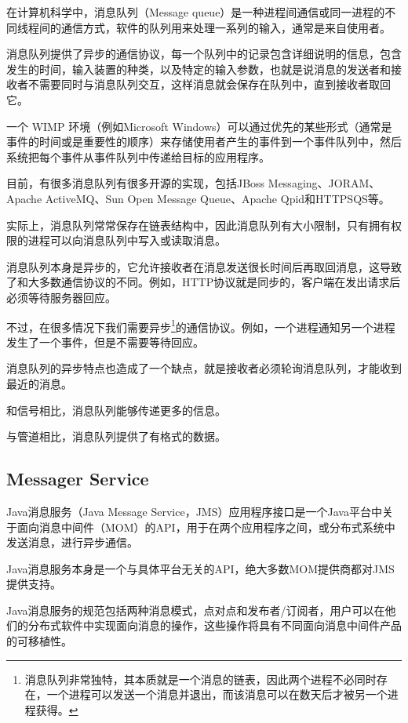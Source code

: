 在计算机科学中，消息队列（Message queue）是一种进程间通信或同一进程的不同线程间的通信方式，软件的队列用来处理一系列的输入，通常是来自使用者。

消息队列提供了异步的通信协议，每一个队列中的记录包含详细说明的信息，包含发生的时间，输入装置的种类，以及特定的输入参数，也就是说消息的发送者和接收者不需要同时与消息队列交互，这样消息就会保存在队列中，直到接收者取回它。

一个 WIMP 环境（例如Microsoft Windows）可以通过优先的某些形式（通常是事件的时间或是重要性的顺序）来存储使用者产生的事件到一个事件队列中，然后系统把每个事件从事件队列中传递给目标的应用程序。


目前，有很多消息队列有很多开源的实现，包括JBoss Messaging、JORAM、Apache ActiveMQ、Sun Open Message Queue、Apache Qpid和HTTPSQS等。

实际上，消息队列常常保存在链表结构中，因此消息队列有大小限制，只有拥有权限的进程可以向消息队列中写入或读取消息。

消息队列本身是异步的，它允许接收者在消息发送很长时间后再取回消息，这导致了和大多数通信协议的不同。例如，HTTP协议就是同步的，客户端在发出请求后必须等待服务器回应。

不过，在很多情况下我们需要异步\footnote{消息队列非常独特，其本质就是一个消息的链表，因此两个进程不必同时存在，一个进程可以发送一个消息并退出，而该消息可以在数天后才被另一个进程获得。}的通信协议。例如，一个进程通知另一个进程发生了一个事件，但是不需要等待回应。

消息队列的异步特点也造成了一个缺点，就是接收者必须轮询消息队列，才能收到最近的消息。

\begin{compactitem}
\item 和信号相比，消息队列能够传递更多的信息。
\item 与管道相比，消息队列提供了有格式的数据。
\end{compactitem}


\subsection{Messager Service}

Java消息服务（Java Message Service，JMS）应用程序接口是一个Java平台中关于面向消息中间件（MOM）的API，用于在两个应用程序之间，或分布式系统中发送消息，进行异步通信。

Java消息服务本身是一个与具体平台无关的API，绝大多数MOM提供商都对JMS提供支持。

Java消息服务的规范包括两种消息模式，点对点和发布者/订阅者，用户可以在他们的分布式软件中实现面向消息的操作，这些操作将具有不同面向消息中间件产品的可移植性。

